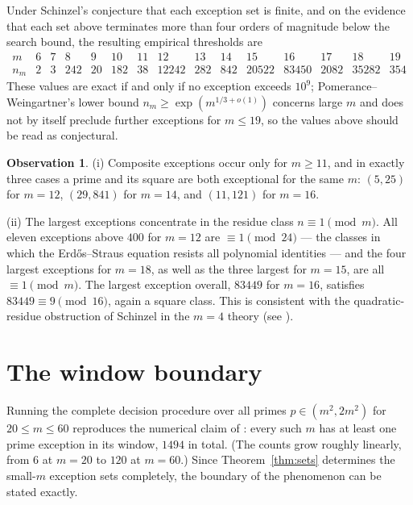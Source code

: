 \documentclass[11pt]{amsart}
\theoremstyle{remark}
\theoremstyle{definition}
\newtheorem{observation}[theorem]{Observation}
\begin{document}
Under Schinzel's conjecture that each exception set is finite, and on the
evidence that each set above terminates more than four orders of
magnitude below the search bound, the resulting empirical thresholds are
\[
\begin{array}{c|cccccccccccccc}
m & 6 & 7 & 8 & 9 & 10 & 11 & 12 & 13 & 14 & 15 & 16 & 17 & 18 & 19\\
\hline
n_m & 2 & 3 & 242 & 20 & 182 & 38 & 12242 & 282 & 842 & 20522 & 83450 & 2082 & 35282 & 354
\end{array}
\]
These values are exact if and only if no exception exceeds $10^9$;
Pomerance--Weingartner's lower bound $n_m \ge \exp(m^{1/3+o(1)})$
concerns large $m$ and does not by itself preclude further exceptions
for $m \le 19$, so the values above should be read as conjectural.

\begin{observation}\label{obs:structure}
(i) Composite exceptions occur only for $m \ge 11$, and in exactly three
cases a prime and its square are both exceptional for the same $m$:
$(5, 25)$ for $m = 12$, $(29, 841)$ for $m = 14$, and $(11, 121)$ for
$m = 16$.

(ii) The largest exceptions concentrate in the residue class
$n \equiv 1 \pmod m$. All eleven exceptions above $400$ for $m = 12$ are
$\equiv 1 \pmod{24}$ --- the classes in which the Erd\H{o}s--Straus
equation resists all polynomial identities --- and the four largest
exceptions for $m = 18$, as well as the three largest for $m = 15$, are
all $\equiv 1 \pmod m$. The largest exception overall, $83449$ for
$m = 16$, satisfies $83449 \equiv 9 \pmod{16}$, again a square class.
This is consistent with the quadratic-residue obstruction of Schinzel in
the $m = 4$ theory (see \cite{mordell1969, elsholtztao2013}).
\end{observation}

\section{The window boundary}\label{sec:window}

Running the complete decision procedure over all primes
$p \in (m^2, 2m^2)$ for $20 \le m \le 60$ reproduces the numerical claim
of \cite{pomeranceweingartner2026}: every such $m$ has at least one prime
exception in its window, $1494$ in total. (The counts grow roughly
linearly, from $6$ at $m = 20$ to $120$ at $m = 60$.) Since
Theorem~\ref{thm:sets} determines the small-$m$ exception sets
completely, the boundary of the phenomenon can be stated exactly.
\end{document}
